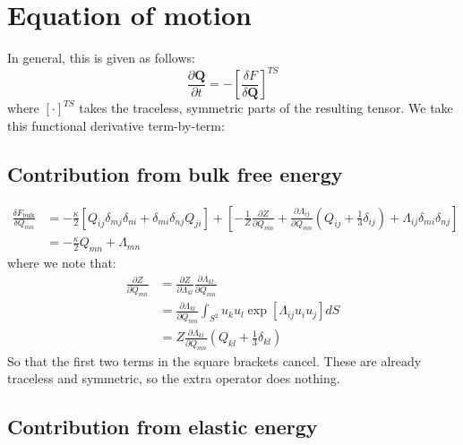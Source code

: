 \documentclass[reqno]{article}
\newcommand{\Q}{\mathbf{Q}}
\begin{document}
\section{Equation of motion}

In general, this is given as follows:
\begin{equation}
    \frac{\partial \Q}{\partial t}
    =
    -\left[
        \frac{\delta F}{\delta \Q}
    \right]^{TS}
\end{equation}
where $\left[ \cdot \right]^{TS}$ takes the traceless, symmetric parts of the resulting tensor.
We take this functional derivative term-by-term:

\subsection{Contribution from bulk free energy}

\begin{equation}
\begin{split}
    \frac{\delta F_\text{bulk}}{\delta Q_{mn}}
    &=
    -\frac{\kappa}{2} \left[
        Q_{ij} \delta_{mj} \delta_{ni}
        + \delta_{mi} \delta_{nj} Q_{ji}
    \right]
    + 
    \left[
        -\frac{1}{Z} \frac{\partial Z}{\partial Q_{mn}}
        + \frac{\partial \Lambda_{ij}}{\partial Q_{mn}} \left( Q_{ij} + \tfrac13 \delta_{ij} \right)
        + \Lambda_{ij} \delta_{mi} \delta_{nj}
    \right] \\
    &=
    -\frac{\kappa}{2} Q_{mn}
    +
    \Lambda_{mn}
\end{split}
\end{equation}
where we note that:
\begin{equation}
\begin{split}
    \frac{\partial Z}{\partial Q_{mn}}
    &=
    \frac{\partial Z}{\partial \Lambda_{kl}}
    \frac{\partial \Lambda_{kl}}{\partial Q_{mn}} \\
    &=
    \frac{\partial \Lambda_{kl}}{\partial Q_{mn}}
    \int_{S^2} u_k u_l \exp\left[ \Lambda_{ij} u_i u_j \right] dS \\
    &=
    Z \frac{\partial \Lambda_{kl}}{\partial Q_{mn}}
    \left(Q_{kl} + \tfrac13 \delta_{kl} \right)
\end{split}
\end{equation}
So that the first two terms in the square brackets cancel.
These are already traceless and symmetric, so the extra operator does nothing.

\subsection{Contribution from elastic energy}
\end{document}
